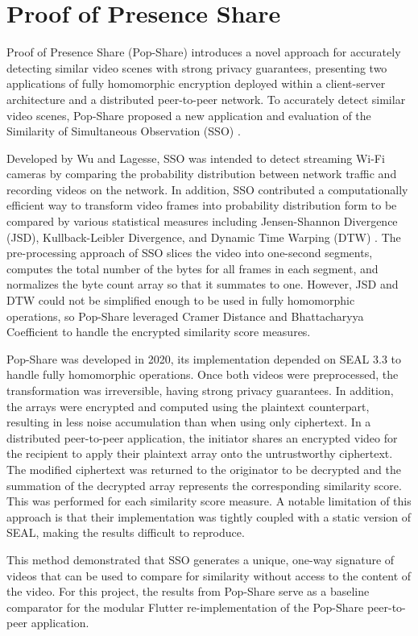 \section{Proof of Presence Share}

Proof of Presence Share (Pop-Share) \cite{Lagesse2021-PopShare} introduces a novel approach for accurately detecting similar video scenes with strong privacy guarantees, presenting two applications of fully homomorphic encryption deployed within a client-server architecture and a distributed peer-to-peer network. To accurately detect similar video scenes, Pop-Share proposed a new application and evaluation of the Similarity of Simultaneous Observation (SSO) \cite{Wu2019-SSO}. 

Developed by Wu and Lagesse, SSO was intended to detect streaming Wi-Fi cameras by comparing the probability distribution between network traffic and recording videos on the network. In addition, SSO contributed a computationally efficient way to transform video frames into probability distribution form to be compared by various statistical measures including Jensen-Shannon Divergence (JSD), Kullback-Leibler Divergence, and Dynamic Time Warping (DTW) \cite{Sakoe1978-dtw}. The pre-processing approach of SSO slices the video into one-second segments, computes the total number of the bytes for all frames in each segment, and normalizes the byte count array so that it summates to one. However, JSD and DTW could not be simplified enough to be used in fully homomorphic operations, so Pop-Share leveraged Cramer Distance and Bhattacharyya Coefficient to handle the encrypted similarity score measures.

Pop-Share was developed in 2020, its implementation depended on SEAL 3.3 to handle fully homomorphic operations. Once both videos were preprocessed, the transformation was irreversible, having strong privacy guarantees. In addition, the arrays were encrypted and computed using the plaintext counterpart, resulting in less noise accumulation than when using only ciphertext. In a distributed peer-to-peer application, the initiator shares an encrypted video for the recipient to apply their plaintext array onto the untrustworthy ciphertext. The modified ciphertext was returned to the originator to be decrypted and the summation of the decrypted array represents the corresponding similarity score. This was performed for each similarity score measure. A notable limitation of this approach is that their implementation was tightly coupled with a static version of SEAL, making the results difficult to reproduce.

This method demonstrated that SSO generates a unique, one-way signature of videos that can be used to compare for similarity without access to the content of the video. For this project, the results from Pop-Share serve as a baseline comparator for the modular Flutter re-implementation of the Pop-Share peer-to-peer application.
